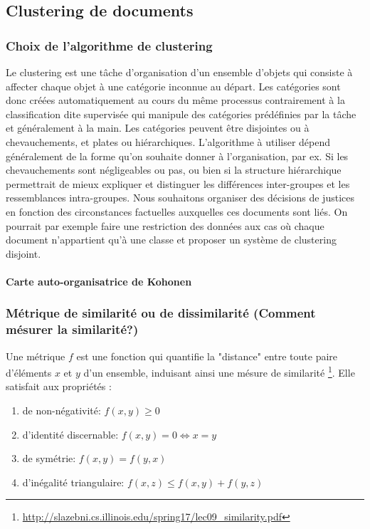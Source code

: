 \subsection{Clustering de documents}

\subsubsection{Choix de l’algorithme de clustering}

Le clustering est une tâche d’organisation d’un ensemble d’objets qui consiste à affecter chaque objet à une catégorie inconnue au départ. Les catégories sont donc créées automatiquement au cours du même processus contrairement à la classification dite supervisée qui manipule des catégories prédéfinies par la tâche et généralement à la main. Les catégories peuvent être disjointes ou à chevauchements, et plates ou hiérarchiques. 
L’algorithme à utiliser dépend généralement de la forme qu’on souhaite donner à l’organisation, par ex. Si les chevauchements sont négligeables ou pas, ou bien si la structure hiérarchique permettrait de mieux expliquer et distinguer les différences inter-groupes et les ressemblances intra-groupes. Nous souhaitons organiser des décisions de justices en fonction des circonstances factuelles auxquelles ces documents sont liés.  On pourrait par exemple faire une restriction des données aux cas où chaque document n’appartient qu’à une classe et proposer un système de clustering disjoint.

\paragraph{Carte auto-organisatrice de Kohonen}


\subsubsection{Métrique de similarité ou de dissimilarité (Comment mésurer la similarité?)}
Une métrique $f$ est une fonction qui quantifie la "distance" entre toute paire d'éléments $x$ et $y$ d'un ensemble, induisant ainsi une mésure de similarité \footnote{\url{http://slazebni.cs.illinois.edu/spring17/lec09_similarity.pdf}}. Elle satisfait aux propriétés :
\begin{enumerate}
\item de non-négativité: $f(x,y) \geq 0$
\item d'identité discernable: $f(x,y) = 0  \Leftrightarrow x = y$
\item de symétrie: $f(x,y) = f(y, x)$
\item d'inégalité triangulaire: $f(x,z) \leq f(x,y) + f(y,z)$ \label{enum:sim:ineq-tri}
\end{enumerate}

